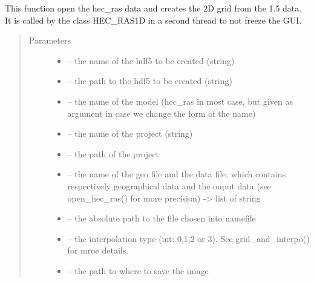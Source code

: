 \documentclass[letterpaper,10pt,english]{sphinxmanual}
\begin{document}
\begin{fulllineitems}
\label{\detokenize{index:src.Hec_ras06.open_hec_hec_ras_and_create_grid}}
This function open the hec\_ras data and creates the 2D grid from the 1.5 data. It is called by the class HEC\_RAS1D
in a second thread to not freeze the GUI.
\begin{quote}\begin{description}
\item[{Parameters}] \leavevmode\begin{itemize}
\item {} 
 -- the name of the hdf5 to be created (string)

\item {} 
 -- the path to the hdf5 to be created (string)

\item {} 
 -- the name of the model (hec\_ras in most case, but given as argument in case we change
the form of the name)

\item {} 
 -- the name of the project (string)

\item {} 
 -- the path of the project

\item {} 
 -- the name of the geo file and the data file, which contains respectively geographical data and
the ouput data (see open\_hec\_ras() for more precision) -\textgreater{} list of string

\item {} 
 -- the absolute path to the file chosen into namefile

\item {} 
 -- the interpolation type (int: 0,1,2 or 3). See grid\_and\_interpo() for mroe details.

\item {} 
 -- the path to where to save the image


\end{itemize}
\end{description}
\end{quote}
\end{fulllineitems}
\end{document}
